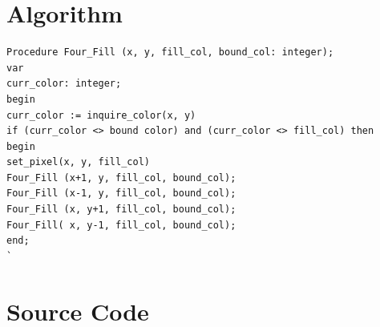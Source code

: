 \documentclass[11pt]{report}
\begin{document}
\section{Algorithm}
\begin{lstlisting}
Procedure Four_Fill (x, y, fill_col, bound_col: integer);
var
curr_color: integer;
begin
curr_color := inquire_color(x, y)
if (curr_color <> bound color) and (curr_color <> fill_col) then
begin
set_pixel(x, y, fill_col)
Four_Fill (x+1, y, fill_col, bound_col);
Four_Fill (x-1, y, fill_col, bound_col);
Four_Fill (x, y+1, fill_col, bound_col);
Four_Fill( x, y-1, fill_col, bound_col);
end;
`
\end{lstlisting}

\section{Source Code}
\end{document}
